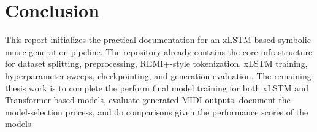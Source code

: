 \section{Conclusion}

This report initializes the practical documentation for an xLSTM-based symbolic music generation pipeline. The repository already contains the core infrastructure for dataset splitting, preprocessing, REMI+-style tokenization, xLSTM training, hyperparameter sweeps, checkpointing, and generation evaluation. The remaining thesis work is to complete the perform final model training for both xLSTM and Transformer based models, evaluate generated MIDI outputs, document the model-selection process, and do comparisons given the performance scores of the models.

